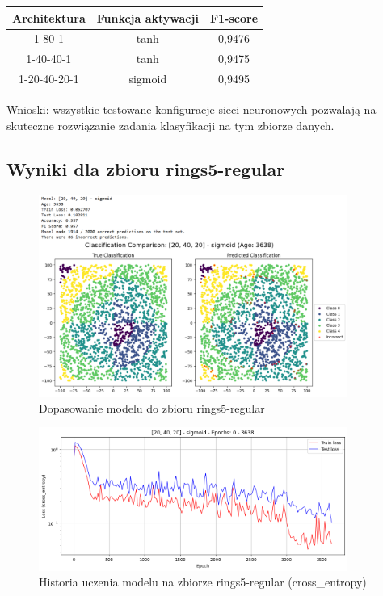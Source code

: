 \documentclass{article}
\begin{document}
\begin{center}
\begin{tabular}{|c|c|c|}
    \hline
    Architektura & Funkcja aktywacji & F1-score \\
    \hline
    1-80-1 & tanh & 0,9476 \\
    1-40-40-1 & tanh & 0,9475 \\
    1-20-40-20-1 & sigmoid & 0,9495 \\
    \hline
\end{tabular}
\end{center}

Wnioski: wszystkie testowane konfiguracje sieci neuronowych pozwalają na skuteczne rozwiązanie zadania klasyfikacji na tym zbiorze danych.

\subsection*{Wyniki dla zbioru rings5-regular}
\begin{figure}[H]
    \centering
    \includegraphics[width=0.9\textwidth]{img/nn5/rings5_fit.png}
    \caption{Dopasowanie modelu do zbioru rings5-regular}
\end{figure}
\begin{figure}[H]
    \centering
    \includegraphics[width=0.9\textwidth]{img/nn5/rings5_history.png}
    \caption{Historia uczenia modelu na zbiorze rings5-regular (cross\_entropy)}
\end{figure}
\end{document}
